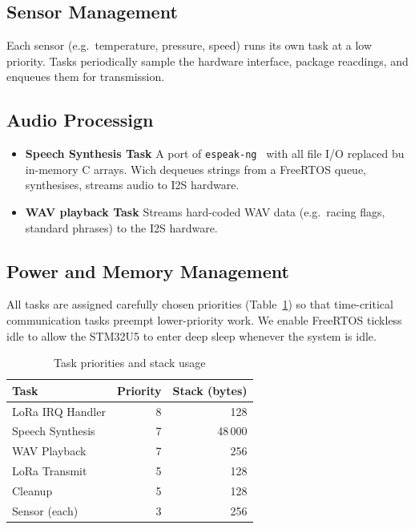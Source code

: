 \subsection{Sensor Management}
Each sensor (e.g.\ temperature, pressure, speed) runs its own task at a low priority. Tasks periodically sample the hardware interface, package reacdings, and enqueues them for transmission.

\subsection{Audio Processign}
\begin{itemize}
  \item \textbf{Speech Synthesis Task}
    A port of \texttt{espeak-ng}~\cite{espeakng} with all file I/O replaced bu in-memory C arrays. Wich dequeues strings from a FreeRTOS queue, synthesises, streams audio to I2S hardware.
  \item \textbf{WAV playback Task}
    Streams hard-coded WAV data (e.g.\ racing flags, standard phrases) to the I2S hardware.
\end{itemize}

\subsection{Power and Memory Management}

All tasks are assigned carefully chosen priorities (Table~\ref{tab:priorities}) so that time-critical communication tasks preempt lower-priority work. We enable FreeRTOS tickless idle to allow the STM32U5 to enter deep sleep whenever the system is idle.

\begin{table}[H]
  \centering
  \caption{Task priorities and stack usage}
  \label{tab:priorities}
  \begin{tabular}{lrr}
    \hline
    Task                     & Priority & Stack (bytes) \\
    \hline
    LoRa IRQ Handler         & 8        & 128            \\
    Speech Synthesis         & 7        & 48\,000        \\
    WAV Playback             & 7        & 256            \\
    LoRa Transmit            & 5        & 128            \\
    Cleanup                  & 5        & 128            \\
    Sensor (each)            & 3        & 256            \\
    \hline
  \end{tabular}
\end{table}
